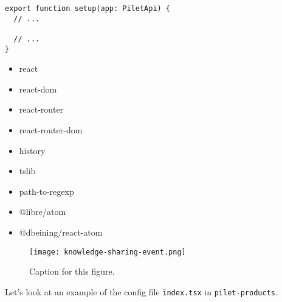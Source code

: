 \begin{lstlisting}[caption={pilet-products index.tsx}]
  export function setup(app: PiletApi) {
  // ...

  // ...
}
\end{lstlisting}

\begin{itemize}
    \item react
    \item react-dom
    \item react-router
    \item react-router-dom
    \item history
    \item tslib
    \item path-to-regexp
    \item @libre/atom
    \item @dbeining/react-atom
    
\end{itemize}

\begin{figure}[h!]
  \centering
  \captionsetup{justification=centering}
  \texttt{[image: knowledge-sharing-event.png]}
  \caption{Caption for this figure.}
  \label{fig:1}
\end{figure}


Let’s look at an example of the config file \verb|index.tsx| in \verb|pilet-products|.